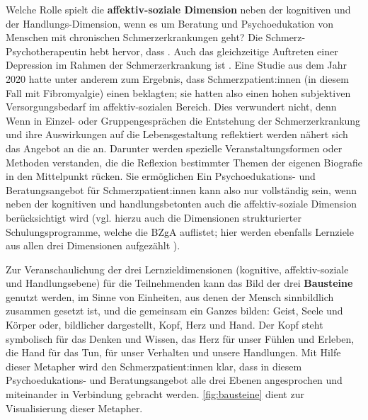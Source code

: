 \documentclass[
  twoside,
  parskip=half-,
]{scrreprt}
\begin{document}
\begin{praxis}
Welche Rolle spielt die \textbf{affektiv-soziale Dimension} neben der kognitiven und der Handlungs-Dimension, wenn es um Beratung und Psychoedukation von Menschen mit chronischen Schmerzerkrankungen geht? Die Schmerz-Psychotherapeutin \citeauthor{glier} hebt hervor, dass . Auch das gleichzeitige Auftreten einer Depression im Rahmen der Schmerzerkrankung ist . Eine Studie aus dem Jahr 2020 hatte unter anderem zum Ergebnis, dass Schmerzpatient:innen (in diesem Fall mit Fibromyalgie) einen  beklagten; sie hatten also einen hohen subjektiven Versorgungsbedarf im affektiv-sozialen Bereich. Dies verwundert nicht, denn  Wenn in Einzel- oder Gruppengesprächen die Entstehung der Schmerzerkrankung und ihre Auswirkungen auf die Lebensgestaltung reflektiert werden nähert sich das Angebot an die  an. Darunter werden spezielle Veranstaltungsformen oder Methoden verstanden, die die Reflexion bestimmter Themen der eigenen Biografie in den Mittelpunkt rücken. Sie ermöglichen  Ein Psychoedukations- und Beratungsangebot für Schmerzpatient:innen kann also nur vollständig sein, wenn neben der kognitiven und handlungsbetonten auch die affektiv-soziale Dimension berücksichtigt wird (vgl. hierzu auch die Dimensionen strukturierter Schulungsprogramme, welche die BZgA auflistet; hier werden ebenfalls Lernziele aus allen drei Dimensionen aufgezählt \autocite[vgl.][]{BZGABeratungEdukation}). 

Zur Veranschaulichung der drei Lernzieldimensionen (kognitive, affektiv-soziale und Handlungsebene) für die Teilnehmenden kann das Bild der drei \textbf{Bausteine} genutzt werden, im Sinne von Einheiten, aus denen der Mensch sinnbildlich zusammen gesetzt ist, und die gemeinsam ein Ganzes bilden: Geist, Seele und Körper oder, bildlicher dargestellt, Kopf, Herz und Hand. Der Kopf steht symbolisch für das Denken und Wissen, das Herz für unser Fühlen und Erleben, die Hand für das Tun, für unser Verhalten und unsere Handlungen. Mit Hilfe dieser Metapher wird den Schmerzpatient:innen klar, dass in diesem Psychoedukations- und Beratungsangebot alle drei Ebenen angesprochen und miteinander in Verbindung gebracht werden. \autoref{fig:bausteine} dient zur Visualisierung dieser Metapher.
 \end{praxis}
 
\end{document}
